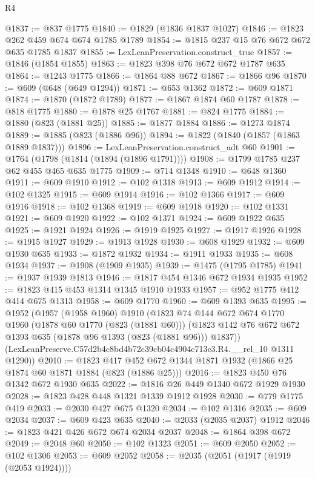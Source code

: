 \begin{lexlean}{R4}
\begin{coremodule}
@1837 := @837 @1775
@1840 := @1829 (@1836 @1837 @1027)
@1846 := @1823 @262 @459 @674 @674 @1785 @1789
@1854 := @1815 @237 @15 @76 @672 @672 @635 @1785 @1837
@1855 := LexLeanPreservation.construct_true
@1857 := @1846 (@1854 @1855)
@1863 := @1823 @398 @76 @672 @672 @1787 @635
@1864 := @1243 @1775
@1866 := @1864 @88 @672
@1867 := @1866 @96
@1870 := @609 (@648 (@649 @1294))
@1871 := @653 @1362
@1872 := @609 @1871
@1874 := @1870 (@1872 @1789)
@1877 := @1867 @1874 @60 @1787
@1878 := @818 @1775
@1880 := @1878 @25 @1767
@1881 := @824 @1775
@1884 := @1880 (@823 (@1881 @25))
@1885 := @1877 @1884
@1886 := @1273 @1874
@1889 := @1885 (@823 (@1886 @96))
@1894 := @1822 (@1840 (@1857 (@1863 @1889 @1837)))
@1896 := LexLeanPreservation.construct_adt @60
@1901 := @1764 (@1798 (@1814 (@1894 (@1896 @1791))))
@1908 := @1799 @1785 @237 @62 @455 @465 @635 @1775
@1909 := @714 @1348
@1910 := @648 @1360
@1911 := @609 @1910
@1912 := @102 @1318
@1913 := @609 @1912
@1914 := @102 @1325
@1915 := @609 @1914
@1916 := @102 @1366
@1917 := @609 @1916
@1918 := @102 @1368
@1919 := @609 @1918
@1920 := @102 @1331
@1921 := @609 @1920
@1922 := @102 @1371
@1924 := @609 @1922 @635
@1925 := @1921 @1924
@1926 := @1919 @1925
@1927 := @1917 @1926
@1928 := @1915 @1927
@1929 := @1913 @1928
@1930 := @608 @1929
@1932 := @609 @1930 @635
@1933 := @1872 @1932
@1934 := @1911 @1933
@1935 := @608 @1934
@1937 := @1908 (@1909 @1935)
@1939 := @1475 (@1795 @1785)
@1941 := @1937 @1939 @1813
@1946 := @1817 @454 @1346 @672 @1934 @1935
@1952 := @1823 @415 @453 @1314 @1345 @1910 @1933
@1957 := @952 @1775 @412 @414 @675 @1313
@1958 := @609 @1770
@1960 := @609 @1393 @635
@1995 := @1952
    (@1957
      (@1958 @1960)
      @1910
      (@1823
        @74
        @144
        @672
        @674
        @1770
        @1960
        (@1878 @60 @1770 (@823 (@1881 @60)))
        (@1823 @142 @76 @672 @672 @1393 @635 (@1878 @96 @1393 (@823 (@1881 @96))) @1837))
      (LexLeanPreserve.C57d2b4c8bd4b72c39cb04c4904c713c3.R4.__rel_10 @1311 @1290))
@2010 := @1823 @417 @452 @672 @1344 @1871 @1932 (@1866 @25 @1874 @60 @1871 @1884 (@823 (@1886 @25)))
@2016 := @1823 @450 @76 @1342 @672 @1930 @635
@2022 := @1816 @26 @449 @1340 @672 @1929 @1930
@2028 := @1823 @428 @448 @1321 @1339 @1912 @1928
@2030 := @779 @1775 @419
@2033 := @2030 @427 @675 @1320
@2034 := @102 @1316
@2035 := @609 @2034
@2037 := @609 @423 @635
@2040 := @2033 (@2035 @2037) @1912
@2046 := @1823 @421 @426 @672 @674 @2034 @2037
@2048 := @1864 @398 @672
@2049 := @2048 @60
@2050 := @102 @1323
@2051 := @609 @2050
@2052 := @102 @1306
@2053 := @609 @2052
@2058 := @2035 (@2051 (@1917 (@1919 (@2053 @1924))))

\end{coremodule}
\end{lexlean}
